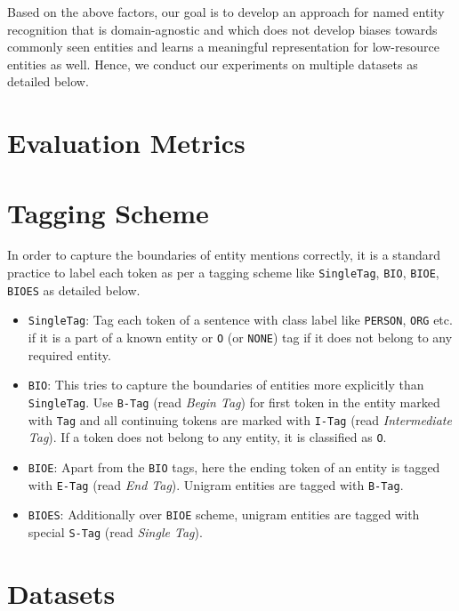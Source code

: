 Based on the above factors, our goal is to develop an approach for named entity recognition that is domain-agnostic and which does not develop biases towards commonly seen entities and learns a meaningful representation for low-resource entities as well. Hence, we conduct our experiments on multiple datasets as detailed below. 

\section{Evaluation Metrics}

\section{Tagging Scheme}
In order to capture the boundaries of entity mentions correctly, it is a standard practice to label each token as per a tagging scheme like \texttt{SingleTag}, \texttt{BIO}, \texttt{BIOE}, \texttt{BIOES} as detailed below.

\begin{itemize}
    \item \texttt{SingleTag}: Tag each token of a sentence with class label like \texttt{PERSON}, \texttt{ORG} etc. if it is a part of a known entity or \texttt{O} (or \texttt{NONE}) tag if it does not belong to any required entity.
    
    \item \texttt{BIO}: This tries to capture the boundaries of entities more explicitly than \texttt{SingleTag}. Use \texttt{B-Tag} (read \textit{Begin Tag}) for first token in the entity marked with \texttt{Tag} and all continuing tokens are marked with \texttt{I-Tag} (read \textit{Intermediate Tag}). If a token does not belong to any entity, it is classified as \texttt{O}.
    
    \item \texttt{BIOE}: Apart from the \texttt{BIO} tags, here the ending token of an entity is tagged with \texttt{E-Tag} (read \textit{End Tag}). Unigram entities are tagged with \texttt{B-Tag}.
    
    \item \texttt{BIOES}: Additionally over \texttt{BIOE} scheme, unigram entities are tagged with special \texttt{S-Tag} (read \textit{Single Tag}).
\end{itemize}

\section{Datasets}

